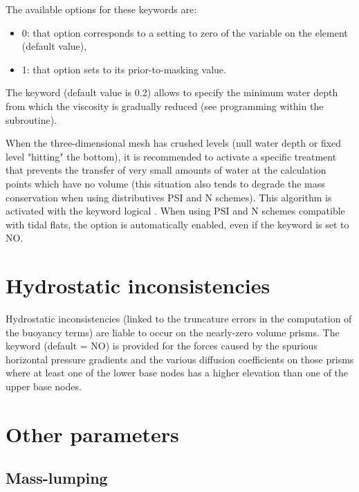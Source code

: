 The available options for these keywords are:

\begin{itemize}
\item 0: that option corresponds to a setting to zero of the variable on the
element (default value),

\item 1: that option sets to its prior-to-masking value.
\end{itemize}

The keyword  (default
value is 0.2) allows to specify the minimum water depth from which the
viscosity is gradually reduced (see programming within the 
subroutine).

When the three-dimensional mesh has crushed levels (null water depth or fixed
level "hitting" the bottom), it is recommended to activate a specific treatment
that prevents the transfer of very small amounts of water at the calculation
points which have no volume (this situation also tends to degrade the mass
conservation when using distributives PSI and N schemes). This algorithm is
activated with the keyword logical . When using PSI
and N schemes compatible with tidal flats, the option is automatically enabled,
even if the keyword is set to NO.

\section{Hydrostatic inconsistencies}

Hydrostatic inconsistencies (linked to the truncature errors in the computation
of the buoyancy terms) are liable to occur on the nearly-zero volume prisms.
The keyword  (default = NO) is
provided for the forces caused by the spurious horizontal pressure gradients
and the various diffusion coefficients on those prisms where at least one of
the lower base nodes has a higher elevation than one of the upper base nodes.

\section{Other parameters}

\subsection{Mass-lumping}

